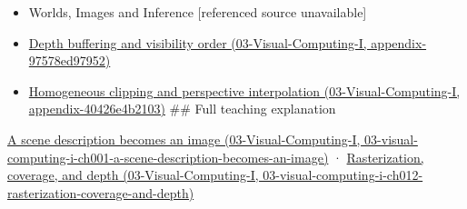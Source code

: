 \begin{itemize}
\item
  {Worlds, Images and Inference {[}referenced source unavailable{]}}
\item
  \href{../03-Visual-Computing-I/main.pdf\#nameddest=appendix-97578ed97952}{Depth buffering and visibility order (03-Visual-Computing-I, appendix-97578ed97952)}
\item
  \href{../03-Visual-Computing-I/main.pdf\#nameddest=appendix-40426e4b2103}{Homogeneous clipping and perspective interpolation (03-Visual-Computing-I, appendix-40426e4b2103)} \#\# Full teaching explanation
\end{itemize}

\href{../03-Visual-Computing-I/main.pdf\#nameddest=03-visual-computing-i-ch001-a-scene-description-becomes-an-image}{A scene description becomes an image (03-Visual-Computing-I, 03-visual-computing-i-ch001-a-scene-description-becomes-an-image)} · \href{../03-Visual-Computing-I/main.pdf\#nameddest=03-visual-computing-i-ch012-rasterization-coverage-and-depth}{Rasterization, coverage, and depth (03-Visual-Computing-I, 03-visual-computing-i-ch012-rasterization-coverage-and-depth)}
